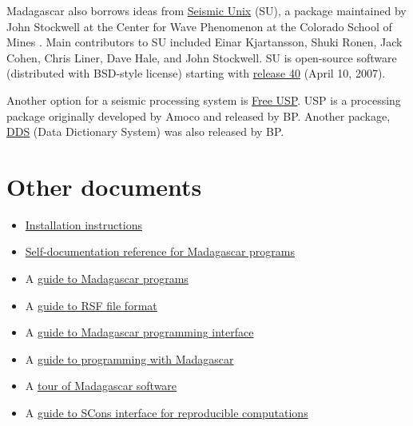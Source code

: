 Madagascar also borrows ideas from
\href{http://timna.mines.edu/cwpcodes/}{Seismic Unix} (SU), a package
maintained by John Stockwell at the Center for Wave Phenomenon at the
Colorado School of Mines \cite[]{TLE16-07-10451049,su}. Main
contributors to SU included Einar Kjartansson, Shuki Ronen, Jack
Cohen, Chris Liner, Dave Hale, and John Stockwell.  SU is open-source
software (distributed with BSD-style license) starting with
\href{ftp://ftp.cwp.mines.edu/pub/cwpcodes/news40}{release 40} (April
10, 2007).

Another option for a seismic processing system is
\href{http://www.freeusp.org/}{Free USP}. USP is a processing package
originally developed by Amoco and released by BP. Another package,
\href{http://www.freeusp.org/DDS/}{DDS} (Data Dictionary System) was
also released by BP.

\begin{comment}
None of these alternative packages can be qualified as free software
according to the
\href{http://www.fsf.org/philosophy/free-sw.html}{Free Software Foundation} or as open-source software according to the
\href{http://www.opensource.org/docs/definition.php}{Open Source Initiative}.  However, they are available for free in the source form
under certain conditions. The Madagascar package is both free and
open-source.
\end{comment}

\section{Other documents}

\begin{itemize}
\item  \href{http://www.reproducibility.org/RSF/book/rsf/rsf/install_html/}{Installation instructions}
\item \href{http://www.reproducibility.org/RSF/}{Self-documentation reference for Madagascar programs}
\item A \href{http://www.reproducibility.org/RSF/book/rsf/rsf/prog_html/}{guide to Madagascar programs}
\item A \href{http://www.reproducibility.org/RSF/book/rsf/rsf/format_html/}{guide to RSF file format}
\item A \href{http://www.reproducibility.org/RSF/book/rsf/rsf/api_html/}{guide to  Madagascar programming interface}
\item A \href{http://www.reproducibility.org/RSF/book/rsf/rsf/demo_html/}{guide to programming with Madagascar}
\item A \href{http://www.reproducibility.org/RSF/book/rsf/rsf/tour_html/}{tour of Madagascar software}
\item A \href{http://www.reproducibility.org/RSF/book/rsf/scons/paper_html/}{guide to SCons interface for reproducible computations}
\end{itemize}




%



